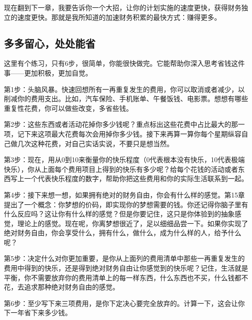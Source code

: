 现在翻到下一章，我要告诉你一个大招，让你的计划实施的速度更快，获得财务独立的速度更快。那就是我所知道的加速财务积累的最快方式：赚得更多。

\subsection{多多留心，处处能省}

这里有个练习，只有6步，很简单，你能很快做完。它能帮助你深入思考省钱这件事——更加积极，更加自觉。

第1步：头脑风暴。快速回想所有一再重复发生的费用，你可以取消或者减少，以削减你的费用支出。比如，汽车保险、手机账单、午餐饭钱、电影票。想想有哪些重复性花费，你可以做些改变，多省些钱。



第2步：这些东西或者活动花掉你多少钱呢？重点标出这些花费中占比最大的那一项，记下来这项最大花费每次会用掉你多少钱。接下来再算一算你每个星期纵容自己做几次这种花费，对自己实话实说，不要只是想当然。

第3步：现在，用从0到10来衡量你的快乐程度（0代表根本没有快乐，10代表极端快乐），你从上面每个费用项目上得到的快乐有多少呢？给每个花钱的活动或者东西写上一个代表快乐程度的数字，帮助你把这些费用和你的实际生活联系到一起。

第4步：接下来想一想，如果拥有绝对的财务自由，你会有什么样的感觉。第15章提出了一个概念：你梦想的价码，即实现你的梦想需要的钱。你还记得你脑子里有什么反应吗？这让你有什么样的感觉？但是你要记住，这只是你体验到的抽象感觉，理论上的感觉。现在呢，你离梦想很近了，足以细细品尝一下。如果你实现了绝对财务自由，你会享受什么，拥有什么，做什么，成为什么样的人，给予什么呢？

第5步：决定什么对你更加重要，是你从上面列的费用清单中那些一再重复发生的费用中得到的快乐，还是得到绝对财务自由让你感觉到的快乐呢？记住，生活就是平衡，你不需要放弃你的费用清单上的每一样东西，什么东西也不买，什么钱都不花，去追求那种绝对财务自由的感觉。

第6步：至少写下来三项费用，是你下定决心要完全放弃的。计算一下，这会让你下一年省下来多少钱。


